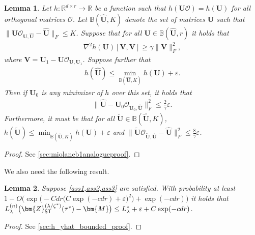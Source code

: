 \documentclass[10pt]{article}
\newcommand{\eps}{\ensuremath{\varepsilon}}
\newcommand{\s}{^*}
\renewcommand{\hat}{\widehat}
\renewcommand{\tilde}{\widetilde}
\newtheorem{lemma}{Lemma}
\theoremstyle{definition}
\begin{document}
\begin{lemma} \label{lem:miolaneb1analogue}
Let $h: \mathbb{R}^{d \times r} \to \mathbb{R}$ be a function such that $h(\bm{U} \mathcal{O}) = h(\bm{U})$ for all orthogonal matrices $\mathcal{O}$. 
Let $\mathbb{B}(\bm{\hat U},K)$ denote the set of matrices $\bm{U}$ such that $\|\bm{U} \mathcal{O}_{\bm{U},\bm{\hat U}} - \bm{\hat U} \|_F \leq K$. 
Suppose that for all $\bm{U} \in \mathbb{B}(\bm{\hat U},r)$ it holds that
    \begin{align}
        \nabla^2 h(\bm{U})[ \bm{V},\bm{V}] \geq \gamma \| \bm{V} \|_F^2,
    \end{align}
    where $\bm{V} = \bm{U}_1 - \bm{U} \mathcal{O}_{\bm{U},\bm{U}_1}$.  Suppose further that
    \begin{align}
        h(\bm{\hat U}) \leq \min_{\mathbb{B}(\bm{\hat U},K)} h(\bm{U}) + \eps.
    \end{align}
    Then if $\bm{U}_0$ is any minimizer of $h$ over this set, it  holds that
    \begin{align}
        \| \bm{\hat U} - \bm{U}_0 \mathcal{O}_{\bm{U}_0, \bm{\hat U}} \|_F^2 \leq \frac{2}{\gamma} \eps.  
    \end{align}
    Furthermore, it must be that for all $\bm{\tilde U} \in \mathbb{B}(\bm{\hat U},K)$, $h(\bm{\tilde U}) \leq \min_{\mathbb{B}(\bm{\hat U},K)} h(\bm{U}) + \eps$ and $\| \bm{\tilde U} \mathcal{O}_{\bm{\tilde U},\bm{\hat U}} - \bm{\hat U} \|_F^2 \leq \frac{8}{\gamma} \eps $. 
\end{lemma}
\begin{proof}
    See \cref{sec:miolaneb1analogueproof}.
\end{proof}





We also need the following result.
\begin{lemma} \label{lem:h_yhat_bounded} Suppose \cref{ass1,ass2,ass3} are satisfied.
With probability at least $1 - O\bigg( \exp\big( - C dr \big( C \exp(- c dr) + \eps \big)^2 \big) + \exp( - c dr) \bigg)$ it holds that $L_{\lambda}^{(n)} \big( \bm{Z}_{{\sf ST}}^{(\lambda/\zeta\s)}(\tau\s) - \bm{M} \big) \leq L_{\lambda}\s + \eps + C \exp( - c dr)$. 
\end{lemma}
\begin{proof}
    See \cref{sec:h_yhat_bounded_proof}.
\end{proof}


  
\end{document}
